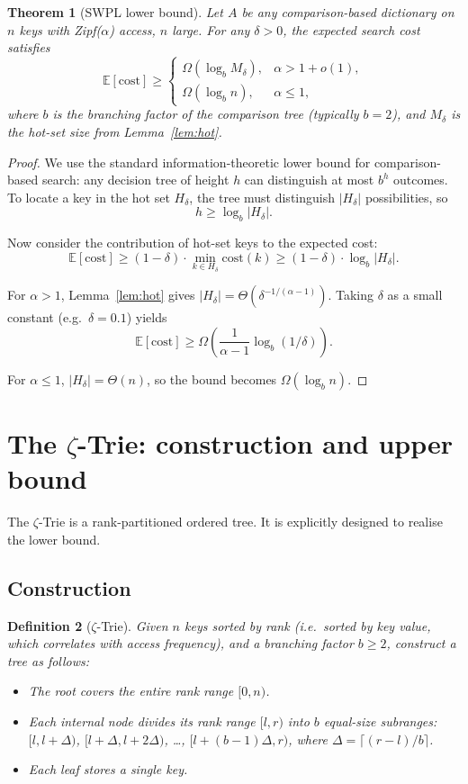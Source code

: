 \documentclass[11pt]{article}
\newtheorem{theorem}{Theorem}[section]
\newtheorem{definition}[theorem]{Definition}
\newcommand{\E}{\mathbb{E}}
\begin{document}
\begin{theorem}[SWPL lower bound]
\label{thm:lower}
Let $A$ be any comparison-based dictionary on $n$ keys with Zipf($\alpha$)
access, $n$ large.  For any $δ>0$, the expected search cost satisfies
\[
\E[\text{cost}] \ge
\begin{cases}
\Omega(\log_b M_δ), & \alpha > 1 + o(1),\\[4pt]
\Omega(\log_b n),   & \alpha \le 1,
\end{cases}
\]
where $b$ is the branching factor of the comparison tree (typically $b=2$),
and $M_δ$ is the hot-set size from Lemma~\ref{lem:hot}.
\end{theorem}

\begin{proof}
We use the standard information-theoretic lower bound for comparison-based
search: any decision tree of height $h$ can distinguish at most $b^h$ outcomes.
To locate a key in the hot set $H_δ$, the tree must distinguish $|H_δ|$
possibilities, so
\[
h \ge \log_b |H_δ|.
\]

Now consider the contribution of hot-set keys to the expected cost:
\[
\E[\text{cost}] \ge (1-δ) \cdot \min_{k\in H_δ} \text{cost}(k)
\ge (1-δ) \cdot \log_b |H_δ|.
\]

For $\alpha>1$, Lemma~\ref{lem:hot} gives $|H_δ| = Θ(δ^{-1/(\alpha-1)})$.
Taking $δ$ as a small constant (e.g.\ $δ=0.1$) yields
\[
\E[\text{cost}] \ge \Omega\!\left(\frac{1}{\alpha-1}\log_b(1/δ)\right).
\]

For $\alpha\le1$, $|H_δ| = Θ(n)$, so the bound becomes $\Omega(\log_b n)$.
\end{proof}

\section{The $\zeta$-Trie: construction and upper bound}

The $\zeta$-Trie is a rank-partitioned ordered tree.  It is explicitly
designed to realise the lower bound.

\subsection{Construction}

\begin{definition}[$\zeta$-Trie]
Given $n$ keys sorted by rank (i.e.\ sorted by key value, which correlates
with access frequency), and a branching factor $b\ge2$, construct a tree
as follows:
\begin{itemize}
  \item The root covers the entire rank range $[0,n)$.
  \item Each internal node divides its rank range $[l,r)$ into $b$ equal-size
        subranges: $[l, l+Δ)$, $[l+Δ, l+2Δ)$, \ldots, $[l+(b-1)Δ, r)$,
        where $Δ = \lceil (r-l)/b \rceil$.
  \item Each leaf stores a single key.
\end{itemize}
\end{definition}
\end{document}
